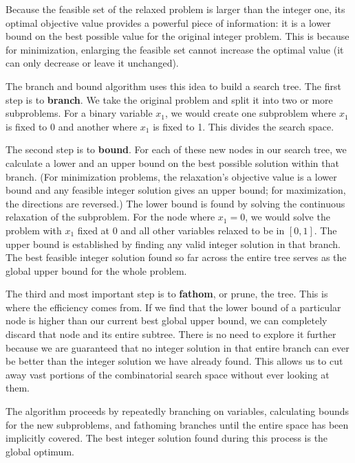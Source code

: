 Because the feasible set of the relaxed problem is larger than the integer one, its optimal objective value provides a powerful piece of information: it is a lower bound on the best possible value for the original integer problem. This is because for minimization, enlarging the feasible set cannot increase the optimal value (it can only decrease or leave it unchanged).

The branch and bound algorithm uses this idea to build a search tree. The first step is to \textbf{branch}. We take the original problem and split it into two or more subproblems. For a binary variable $x_1$, we would create one subproblem where $x_1$ is fixed to 0 and another where $x_1$ is fixed to 1. This divides the search space.

The second step is to \textbf{bound}. For each of these new nodes in our search tree, we calculate a lower and an upper bound on the best possible solution within that branch. (For minimization problems, the relaxation's objective value is a lower bound and any feasible integer solution gives an upper bound; for maximization, the directions are reversed.) The lower bound is found by solving the continuous relaxation of the subproblem. For the node where $x_1=0$, we would solve the problem with $x_1$ fixed at 0 and all other variables relaxed to be in $[0,1]$. The upper bound is established by finding any valid integer solution in that branch. The best feasible integer solution found so far across the entire tree serves as the global upper bound for the whole problem.

The third and most important step is to \textbf{fathom}, or prune, the tree. This is where the efficiency comes from. If we find that the lower bound of a particular node is higher than our current best global upper bound, we can completely discard that node and its entire subtree. There is no need to explore it further because we are guaranteed that no integer solution in that entire branch can ever be better than the integer solution we have already found. This allows us to cut away vast portions of the combinatorial search space without ever looking at them.

The algorithm proceeds by repeatedly branching on variables, calculating bounds for the new subproblems, and fathoming branches until the entire space has been implicitly covered. The best integer solution found during this process is the global optimum.


